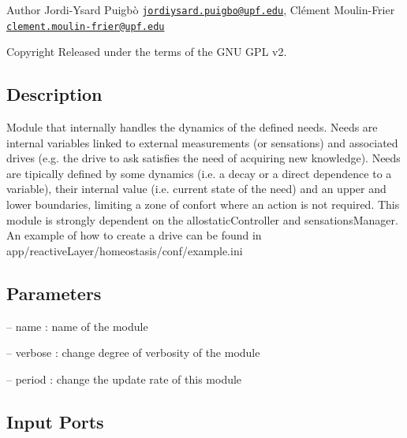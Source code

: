 \begin{DoxyAuthor}{Author}
Jordi-\/\+Ysard Puigbò \href{mailto:jordiysard.puigbo@upf.edu}{\tt jordiysard.\+puigbo@upf.\+edu}, Clément Moulin-\/\+Frier \href{mailto:clement.moulin-frier@upf.edu}{\tt clement.\+moulin-\/frier@upf.\+edu} ~\newline
 
\end{DoxyAuthor}
\begin{DoxyCopyright}{Copyright}
Released under the terms of the G\+NU G\+PL v2. 
\end{DoxyCopyright}
\hypertarget{group__touchDetector_intro_sec}{}\subsection{Description}\label{group__touchDetector_intro_sec}
Module that internally handles the dynamics of the defined needs. Needs are internal variables linked to external measurements (or sensations) and associated drives (e.\+g. the drive to ask satisfies the need of acquiring new knowledge). Needs are tipically defined by some dynamics (i.\+e. a decay or a direct dependence to a variable), their internal value (i.\+e. current state of the need) and an upper and lower boundaries, limiting a zone of confort where an action is not required. This module is strongly dependent on the allostatic\+Controller and sensations\+Manager. An example of how to create a drive can be found in app/reactive\+Layer/homeostasis/conf/example.\+ini\hypertarget{group__touchDetector_parameters_sec}{}\subsection{Parameters}\label{group__touchDetector_parameters_sec}

\begin{DoxyItemize}
\item -- name \+: name of the module
\item -- verbose \+: change degree of verbosity of the module
\item -- period \+: change the update rate of this module 
\end{DoxyItemize}\hypertarget{group__touchDetector_inputports_sec}{}\subsection{Input Ports}\label{group__touchDetector_inputports_sec}

